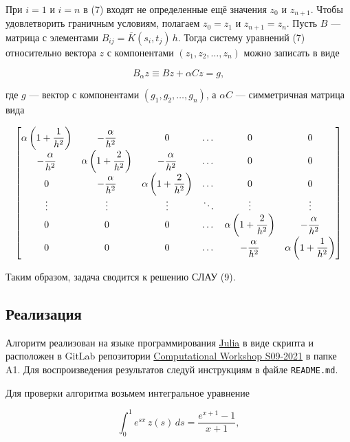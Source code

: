 При $ i = 1 $ и $ i = n $ в (7) входят не определенные ещё значения $ z_0 $ и $ z_{n+1} $. Чтобы удовлетворить граничным условиям, полагаем $ z_0 = z_1 $ и $ z_{n+1} = z_n $. Пусть $ B $ --- матрица с элементами $ B_{ij} = \overline{K}(s_i, t_j) \, h $. Тогда систему уравнений (7) относительно вектора $ z $ с компонентами $ (z_1, z_2, \ldots, z_n) $ можно записать в виде

\begin{equation}
  B_{\alpha} z \equiv Bz + \alpha C z = g,
\end{equation}

где $ g $ --- вектор с компонентами $ (g_1, g_2, \ldots, g_n) $, а $ \alpha C $ --- симметричная матрица вида

\[
\everymath{\displaystyle}
\begin{bmatrix}
  \alpha \left( 1 + \frac{1}{h^2} \right) & -\frac{\alpha}{h^2} & 0 & \dots & 0 & 0 \\
  -\frac{\alpha}{h^2} & \alpha \left( 1 + \frac{2}{h^2} \right) & -\frac{\alpha}{h^2} & \dots & 0 & 0 \\
  0 & -\frac{\alpha}{h^2} & \alpha \left( 1 + \frac{2}{h^2} \right) & \dots & 0 & 0 \\
  \vdots & \vdots & \vdots & \ddots & \vdots & \vdots \\
  0 & 0 & 0 & \dots & \alpha \left( 1 + \frac{2}{h^2} \right) & -\frac{\alpha}{h^2} \\
  0 & 0 & 0 & \dots & -\frac{\alpha}{h^2} & \alpha \left( 1 + \frac{1}{h^2} \right) \\
\end{bmatrix}
\]

Таким образом, задача сводится к решению СЛАУ (9).

\subsection*{Реализация}

Алгоритм реализован на языке программирования \href{https://julialang.org/}{Julia} в виде скрипта и расположен в GitLab репозитории \href{https://gitlab.com/paveloom-g/university/computational-workshop-s09-2021}{Computational Workshop S09-2021} в папке A1. Для воспроизведения результатов следуй инструкциям в файле {\footnotesize \texttt{README.md}}. \npar

Для проверки алгоритма возьмем интегральное уравнение

\begin{equation}
  \int_0^1 e^{sx} \, z(s) \, ds = \frac{e^{x+1} - 1}{x + 1},
\end{equation}

